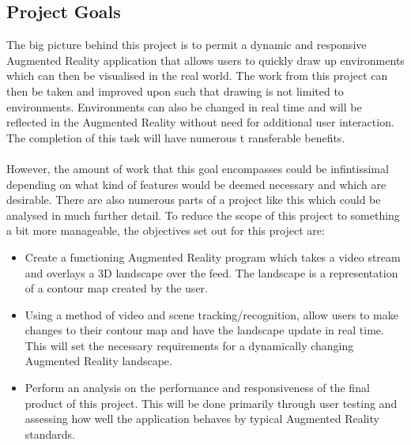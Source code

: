 \documentclass[11pt]{article}
\begin{document}
\subsection{Project Goals}
The big picture behind this project is to permit a dynamic and 
responsive Augmented Reality application that allows
users to quickly draw up environments which can then be visualised in the
real world. The work from this project can then be taken and improved
upon such that drawing is not limited to environments. 
Environments can also be changed in real time and will be 
reflected in the Augmented Reality without need for additional 
user interaction. The completion of this task will have numerous t
ransferable benefits.\\
\\
However, the amount of work that this goal encompasses could be infintissimal
depending on what kind of features would be deemed necessary and which are
desirable. There are also numerous parts of a project like this which could be 
analysed in much further detail. To reduce the scope of this project
to something a bit more manageable, the objectives set out for this project
are:

\begin{itemize}
	\item Create a functioning Augmented Reality program which takes a
		  video stream and overlays a 3D landscape over the feed. The
		  landscape is a representation of a contour map created by
		  the user.
	\item Using a method of video and scene tracking/recognition, allow users
		  to make changes to their contour map and have the landscape update 
		  in real time. This will set the necessary requirements for a
		  dynamically changing Augmented Reality landscape.
	\item Perform an analysis on the performance and responsiveness 
		  of the final product of this project. This will be done
		  primarily through user testing and assessing how well the
		  application behaves by typical Augmented Reality standards.
\end{itemize}
\end{document}
